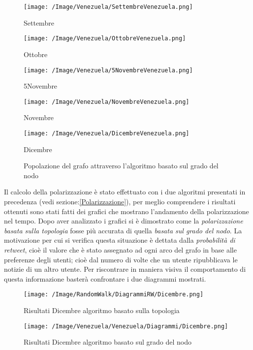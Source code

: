 \begin{figure}[!htbp]
\centering
\begin{minipage}[c]{.40\textwidth}
\centering\setlength{\captionmargin}{0pt}%
\texttt{[image: /Image/Venezuela/SettembreVenezuela.png]}
\caption{Settembre}
\label{Passo0}
\end{minipage}%
\hspace{10mm}%
\begin{minipage}[c]{.40\textwidth}
\centering\setlength{\captionmargin}{0pt}%
\texttt{[image: /Image/Venezuela/OttobreVenezuela.png]}
\caption{Ottobre}
\label{Passo1}
\end{minipage}
\hspace{10mm}%
\begin{minipage}[c]{.40\textwidth}
\centering\setlength{\captionmargin}{0pt}%
\texttt{[image: /Image/Venezuela/5NovembreVenezuela.png]}
\caption{5Novembre}
\label{Passo2}
\end{minipage}
\hspace{10mm}%
\begin{minipage}[c]{.40\textwidth}
\centering\setlength{\captionmargin}{0pt}%
\texttt{[image: /Image/Venezuela/NovembreVenezuela.png]}
\caption{Novembre}
\label{Passo3}
\end{minipage}
\hspace{10mm}%
\begin{minipage}[c]{.40\textwidth}
\centering\setlength{\captionmargin}{0pt}%
\texttt{[image: /Image/Venezuela/DicembreVenezuela.png]}
\caption{Dicembre}
\label{Passo3}
\end{minipage}
\caption{Popolazione del grafo attraverso l'algoritmo basato sul grado del nodo}\label{grafoGrado}
\end{figure}


\newpage
Il calcolo della polarizzazione è stato effettuato con i due algoritmi presentati in precedenza (vedi sezione:\ref{Polarizzazione}), per meglio comprendere i risultati ottenuti sono stati fatti dei grafici che mostrano l'andamento della polarizzazione nel tempo. 
Dopo aver analizzato i grafici si è dimostrato come la \textit{polarizzazione basata sulla topologia} fosse più accurata di quella \textit{basata sul grado del nodo}. La motivazione per cui si verifica questa situazione è dettata dalla \textit{probabilità di retweet}, cioè il valore che è stato assegnato ad ogni arco del grafo in base alle preferenze degli utenti; cioè dal numero di volte che un utente ripubblicava le notizie di un altro utente.
Per riscontrare in maniera visiva il comportamento di questa informazione basterà confrontare i due diagrammi mostrati.
\begin{figure}[!ht]
\centering
\texttt{[image: /Image/RandomWalk/DiagrammiRW/Dicembre.png]}
\caption{Risultati Dicembre algoritmo basato sulla topologia}
\end{figure}
\begin{figure}[!ht]
\centering
\texttt{[image: /Image/Venezuela/Venezuela/Diagrammi/Dicembre.png]}
\caption{Risultati Dicembre algoritmo basato sul grado del nodo}
\end{figure}

